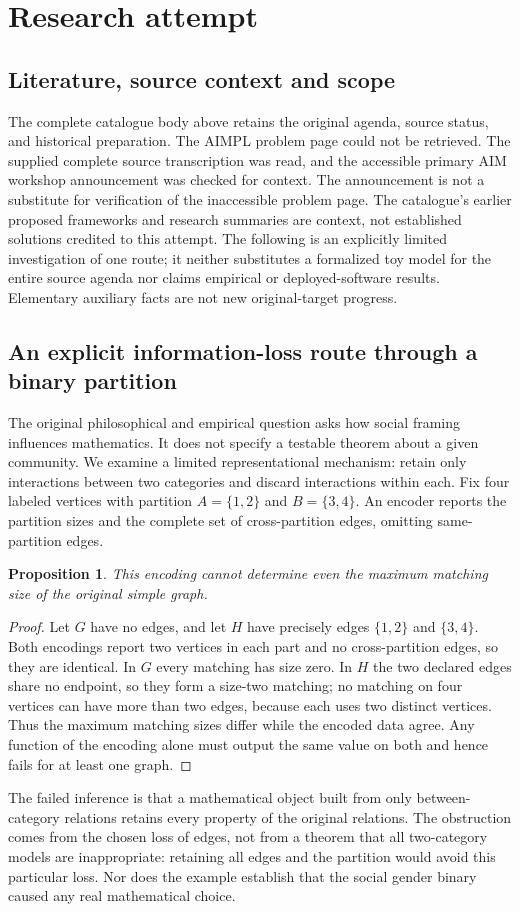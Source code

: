\documentclass[11pt]{article}
\newtheorem{proposition}{Proposition}
\begin{document}
\section{Research attempt}
\subsection{Literature, source context and scope}
The complete catalogue body above retains the original agenda, source status, and historical preparation. The AIMPL problem page could not be retrieved. The supplied complete source transcription was read, and the accessible primary AIM workshop announcement was checked for context. The announcement is not a substitute for verification of the inaccessible problem page. The catalogue's earlier proposed frameworks and research summaries are context, not established solutions credited to this attempt. The following is an explicitly limited investigation of one route; it neither substitutes a formalized toy model for the entire source agenda nor claims empirical or deployed-software results. Elementary auxiliary facts are not new original-target progress.

\subsection{An explicit information-loss route through a binary partition}
The original philosophical and empirical question asks how social framing influences mathematics. It does not specify a testable theorem about a given community. We examine a limited representational mechanism: retain only interactions between two categories and discard interactions within each. Fix four labeled vertices with partition $A=\{1,2\}$ and $B=\{3,4\}$. An encoder reports the partition sizes and the complete set of cross-partition edges, omitting same-partition edges.
\begin{proposition}
This encoding cannot determine even the maximum matching size of the original simple graph.
\end{proposition}
\begin{proof}
Let $G$ have no edges, and let $H$ have precisely edges $\{1,2\}$ and $\{3,4\}$. Both encodings report two vertices in each part and no cross-partition edges, so they are identical. In $G$ every matching has size zero. In $H$ the two declared edges share no endpoint, so they form a size-two matching; no matching on four vertices can have more than two edges, because each uses two distinct vertices. Thus the maximum matching sizes differ while the encoded data agree. Any function of the encoding alone must output the same value on both and hence fails for at least one graph.
\end{proof}
The failed inference is that a mathematical object built from only between-category relations retains every property of the original relations. The obstruction comes from the chosen loss of edges, not from a theorem that all two-category models are inappropriate: retaining all edges and the partition would avoid this particular loss. Nor does the example establish that the social gender binary caused any real mathematical choice.
\end{document}
